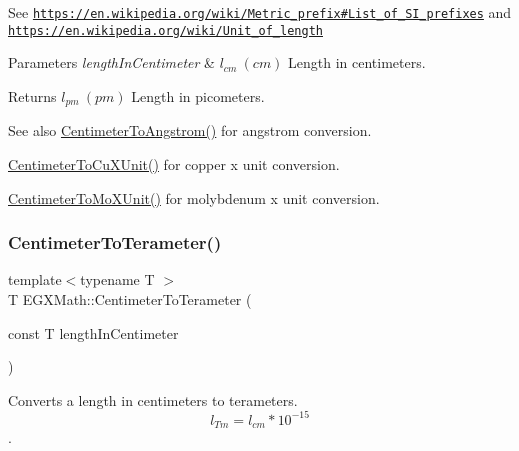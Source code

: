 See \href{https://en.wikipedia.org/wiki/Metric_prefix#List_of_SI_prefixes}{\tt https\+://en.\+wikipedia.\+org/wiki/\+Metric\+\_\+prefix\#\+List\+\_\+of\+\_\+\+S\+I\+\_\+prefixes} and \href{https://en.wikipedia.org/wiki/Unit_of_length}{\tt https\+://en.\+wikipedia.\+org/wiki/\+Unit\+\_\+of\+\_\+length} 
\begin{DoxyParams}{Parameters}
{\em length\+In\+Centimeter} & $ l_{cm}\ (cm)$ Length in centimeters. \\
\hline
\end{DoxyParams}
\begin{DoxyReturn}{Returns}
$ l_{pm}\ (pm)$ Length in picometers. 
\end{DoxyReturn}
\begin{DoxySeeAlso}{See also}
\mbox{\hyperlink{group___e_g_x_math-_conversions-_length_conversions-_centimeter-_non-_s_i_gacabf2b01cd8676ffb5ec8c70ecd621b6}{Centimeter\+To\+Angstrom()}} for angstrom conversion. 

\mbox{\hyperlink{group___e_g_x_math-_conversions-_length_conversions-_centimeter-_non-_s_i_ga98d44269c80a1c5ab7c38d27aba39517}{Centimeter\+To\+Cu\+X\+Unit()}} for copper x unit conversion. 

\mbox{\hyperlink{group___e_g_x_math-_conversions-_length_conversions-_centimeter-_non-_s_i_ga4e94aa6f1cc6aaeb751384a8472b01fd}{Centimeter\+To\+Mo\+X\+Unit()}} for molybdenum x unit conversion. 
\end{DoxySeeAlso}
\mbox{\label{group___e_g_x_math-_conversions-_length_conversions-_centimeter-_s_i_ga84d4f8159550a726d78bb55e6247e10c}} 
\subsubsection{\texorpdfstring{Centimeter\+To\+Terameter()}{CentimeterToTerameter()}}
{\footnotesize\ttfamily template$<$typename T $>$ \\
T E\+G\+X\+Math\+::\+Centimeter\+To\+Terameter (\begin{DoxyParamCaption}\item[{const T}]{length\+In\+Centimeter }\end{DoxyParamCaption})}



Converts a length in centimeters to terameters. \[ l_{Tm}=l_{cm} * 10^{-15} \]. 

